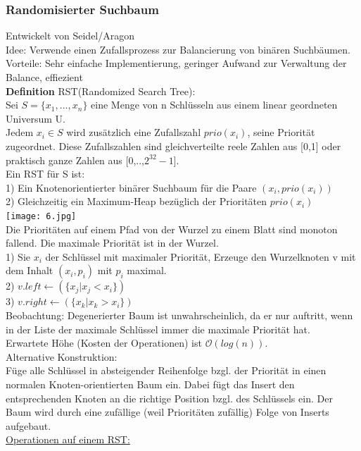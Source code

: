 \documentclass[a4paper]{article}
\newcommand{\oh}[1]{$\mathcal{O}(#1)$}
\begin{document}
\subsubsection{Randomisierter Suchbaum}
Entwickelt von Seidel/Aragon\\
Idee: Verwende einen Zufallsprozess zur Balancierung von binären Suchbäumen.\\
Vorteile: Sehr einfache Implementierung, geringer Aufwand zur Verwaltung der Balance, effiezient\\
\textbf{Definition} RST(Randomized Search Tree):\\
Sei $S=\{x_1,...,x_n\}$ eine Menge von n Schlüsseln aus einem linear geordneten Universum U.\\
Jedem $x_i \in S$ wird zusätzlich eine Zufallszahl $prio(x_i)$, seine Priorität zugeordnet. Diese Zufallszahlen sind gleichverteilte reele Zahlen aus [0,1] oder praktisch ganze Zahlen aus [0,..,$2^{32}-1$].\\
Ein RST für S ist:\\
1) Ein Knotenorientierter binärer Suchbaum für die Paare $(x_i,prio(x_i))$\\
2) Gleichzeitig ein Maximum-Heap bezüglich der Prioritäten $prio(x_i)$\\
\texttt{[image: 6.jpg]}\\
Die Prioritäten auf einem Pfad von der Wurzel zu einem Blatt sind monoton fallend. Die maximale Priorität ist in der Wurzel.\\
1) Sie $x_i$ der Schlüssel mit maximaler Priorität, Erzeuge den Wurzelknoten v mit dem Inhalt $(x_i,p_i)$ mit $p_i$ maximal.\\
2) $v.left \leftarrow (\{x_j | x_j < x_i \})$\\
3) $v.right \leftarrow (\{x_k|x_k > x_i\})$\\
Beobachtung: Degenerierter Baum ist unwahrscheinlich, da er nur auftritt, wenn in der Liste der maximale Schlüssel immer die maximale Priorität hat.\\
Erwartete Höhe (Kosten der Operationen) ist \oh{log(n)}.\\
Alternative Konstruktion:\\
Füge alle Schlüssel in absteigender Reihenfolge bzgl. der Priorität in einen normalen Knoten-orientierten Baum ein. Dabei fügt das Insert den entsprechenden Knoten an die richtige Position bzgl. des Schlüssels ein. Der Baum wird durch eine zufällige (weil Prioritäten zufällig) Folge von Inserts aufgebaut.\\
\underline{Operationen auf einem RST:}\\
\end{document}
